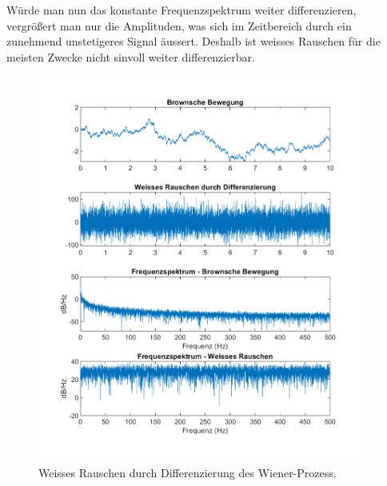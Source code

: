Würde man nun das konstante Frequenzspektrum weiter differenzieren, vergrößert man nur die Amplituden, was sich im Zeitbereich durch ein zunehmend unstetigeres Signal äussert. Deshalb ist weisses Rauschen für die meisten Zwecke nicht sinvoll weiter differenzierbar.

\begin{figure}
	\centering
	\includegraphics[width=0.95\textwidth]{papers/brown/images/weissesRauscheDurchBrown-timeDomain.png}
	\caption{Weisses Rauschen durch Differenzierung des Wiener-Prozess.}
	\label{brown:diffWienerFFT}
\end{figure}


